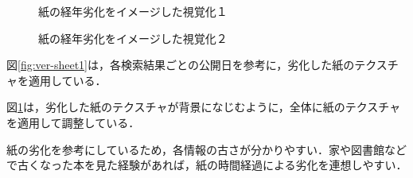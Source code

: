 \begin{figure}[htbp]
  \begin{minipage}{0.5\hsize}
    \begin{center}
    \end{center}
    \caption{紙の経年劣化をイメージした視覚化１}
    \label{fig:ver-sheet1}
  \end{minipage}
  \begin{minipage}{0.5\hsize}
    \begin{center}
    \end{center}
    \caption{紙の経年劣化をイメージした視覚化２}
    \label{fig:ver-sheet2}
  \end{minipage}
\end{figure}

図\ref{fig:ver-sheet1}は，各検索結果ごとの公開日を参考に，劣化した紙のテクスチャを適用している．

図\ref{fig:ver-sheet2}は，劣化した紙のテクスチャが背景になじむように，全体に紙のテクスチャを適用して調整している．

紙の劣化を参考にしているため，各情報の古さが分かりやすい．家や図書館などで古くなった本を見た経験があれば，紙の時間経過による劣化を連想しやすい．

